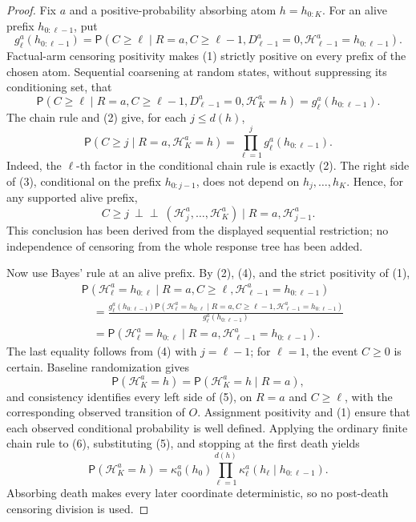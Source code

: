 \documentclass{article}
\begin{document}
\begin{proof}
Fix \(a\) and a positive-probability absorbing atom \(h=h_{0:K}\).  For an alive prefix \(h_{0:\ell-1}\), put
\[
 g_\ell^a(h_{0:\ell-1})
 =\mathsf P(C\ge\ell\mid R=a,C\ge\ell-1,
       D_{\ell-1}^a=0,\mathcal H_{\ell-1}^a=h_{0:\ell-1}).       \tag{1}
\]
Factual-arm censoring positivity makes (1) strictly positive on every prefix of the chosen atom.  Sequential coarsening at random states, without suppressing its conditioning set, that
\[
 \mathsf P(C\ge\ell\mid R=a,C\ge\ell-1,D_{\ell-1}^a=0,
                  \mathcal H_K^a=h)
 =g_\ell^a(h_{0:\ell-1}).                                  \tag{2}
\]
The chain rule and (2) give, for each \(j\le d(h)\),
\[
 \mathsf P(C\ge j\mid R=a,\mathcal H_K^a=h)
 =\prod_{\ell=1}^{j}g_\ell^a(h_{0:\ell-1}).                \tag{3}
\]
Indeed, the \(\ell\)-th factor in the conditional chain rule is exactly (2).  The right side of (3), conditional on the prefix \(h_{0:j-1}\), does not depend on \(h_j,\ldots,h_K\).  Hence, for any supported alive prefix,
\[
 C\ge j\ \perp\!\!\!\perp\
 (\mathcal H_j^a,\ldots,\mathcal H_K^a)
 \mid R=a,\mathcal H_{j-1}^a.                              \tag{4}
\]
This conclusion has been derived from the displayed sequential restriction; no independence of censoring from the whole response tree has been added.

Now use Bayes' rule at an alive prefix.  By (2), (4), and the strict positivity of (1),
\[
\begin{aligned}
 &\mathsf P(\mathcal H_\ell^a=h_{0:\ell}
      \mid R=a,C\ge\ell,\mathcal H_{\ell-1}^a=h_{0:\ell-1})\\
 &\quad=
 \frac{g_\ell^a(h_{0:\ell-1})
       \mathsf P(\mathcal H_\ell^a=h_{0:\ell}
          \mid R=a,C\ge\ell-1,
                 \mathcal H_{\ell-1}^a=h_{0:\ell-1})}
      {g_\ell^a(h_{0:\ell-1})}\\
 &\quad=
 \mathsf P(\mathcal H_\ell^a=h_{0:\ell}
      \mid R=a,\mathcal H_{\ell-1}^a=h_{0:\ell-1}).
\end{aligned}                                             \tag{5}
\]
The last equality follows from (4) with \(j=\ell-1\); for \(\ell=1\), the event \(C\ge0\) is certain.  Baseline randomization gives
\[
 \mathsf P(\mathcal H_K^a=h)=
 \mathsf P(\mathcal H_K^a=h\mid R=a),                      \tag{6}
\]
and consistency identifies every left side of (5), on \(R=a\) and \(C\ge\ell\), with the corresponding observed transition of \(O\).  Assignment positivity and (1) ensure that each observed conditional probability is well defined.  Applying the ordinary finite chain rule to (6), substituting (5), and stopping at the first death yields
\[
 \mathsf P(\mathcal H_K^a=h)
 =\kappa_0^a(h_0)
   \prod_{\ell=1}^{d(h)}
       \kappa_\ell^a(h_\ell\mid h_{0:\ell-1}).            \tag{7}
\]
Absorbing death makes every later coordinate deterministic, so no post-death censoring division is used.


\end{proof}
\end{document}
